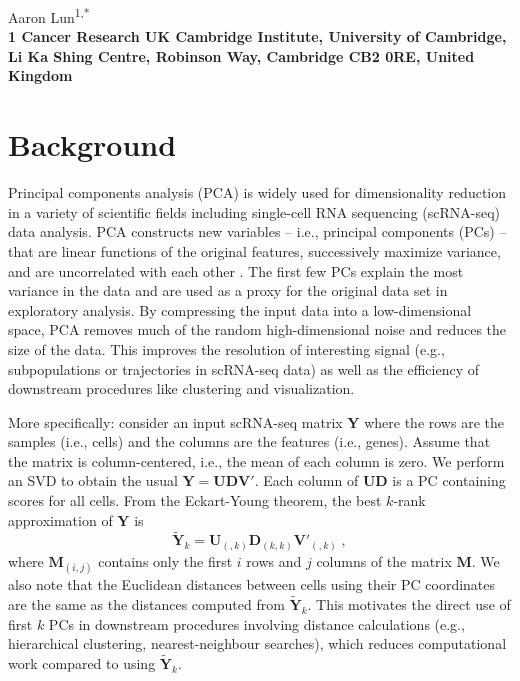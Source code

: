 \documentclass[10pt,letterpaper]{article}
\begin{document}
\vspace*{0.35in}

\begin{flushleft}
{\Large
    \textbf{}
}
\newline

Aaron Lun\textsuperscript{1,*}
\\
\bigskip
\bf{1} Cancer Research UK Cambridge Institute, University of Cambridge, Li Ka Shing Centre, Robinson Way, Cambridge CB2 0RE, United Kingdom \\
\bigskip

\end{flushleft}

\section{Background}
Principal components analysis (PCA) \cite{pearson1901lines,hotelling1933analysis} is widely used for dimensionality reduction in a variety of scientific fields including single-cell RNA sequencing (scRNA-seq) data analysis.
PCA constructs new variables -- i.e., principal components (PCs) -- that are linear functions of the original features, successively maximize variance, and are uncorrelated with each other \cite{jolliffe2016principal}.
The first few PCs explain the most variance in the data and are used as a proxy for the original data set in exploratory analysis.
By compressing the input data into a low-dimensional space, PCA removes much of the random high-dimensional noise and reduces the size of the data.
This improves the resolution of interesting signal (e.g., subpopulations or trajectories in scRNA-seq data) as well as the efficiency of downstream procedures like clustering and visualization.

More specifically: consider an input scRNA-seq matrix $\mathbf{Y}$ where the rows are the samples (i.e., cells) and the columns are the features (i.e., genes).
Assume that the matrix is column-centered, i.e., the mean of each column is zero.
We perform an SVD to obtain the usual $\mathbf{Y} = \mathbf{U}\mathbf{D}\mathbf{V}'$.
Each column of $\mathbf{U}\mathbf{D}$ is a PC containing scores for all cells.
From the Eckart-Young theorem, the best $k$-rank approximation of $\mathbf{Y}$ is 
\[
    \mathbf{\tilde Y}_{k} =  \mathbf{U}_{(,k)}\mathbf{D}_{(k,k)}\mathbf{V}'_{(,k)} \;,
\]
where $\mathbf{M}_{(i,j)}$ contains only the first $i$ rows and $j$ columns of the matrix $\mathbf{M}$.
We also note that the Euclidean distances between cells using their PC coordinates are the same as the distances computed from $\mathbf{\tilde Y}_{k}$.
This motivates the direct use of first $k$ PCs in downstream procedures involving distance calculations (e.g., hierarchical clustering, nearest-neighbour searches), which reduces computational work compared to using $\mathbf{\tilde{Y}}_{k}$.
\end{document}
